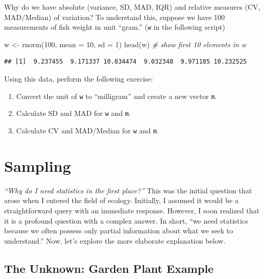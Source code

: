 \documentclass[
]{book}
\newenvironment{Shaded}{\begin{snugshade}}{\end{snugshade}}
\newcommand{\AttributeTok}[1]{\textcolor[rgb]{0.77,0.63,0.00}{#1}}
\newcommand{\CommentTok}[1]{\textcolor[rgb]{0.56,0.35,0.01}{\textit{#1}}}
\newcommand{\DecValTok}[1]{\textcolor[rgb]{0.00,0.00,0.81}{#1}}
\newcommand{\FunctionTok}[1]{\textcolor[rgb]{0.00,0.00,0.00}{#1}}
\newcommand{\NormalTok}[1]{#1}
\newcommand{\OtherTok}[1]{\textcolor[rgb]{0.56,0.35,0.01}{#1}}
\begin{document}
Why do we have absolute (variance, SD, MAD, IQR) and relative measures (CV, MAD/Median) of variation? To understand this, suppose we have 100 measurements of fish weight in unit ``gram.'' (\texttt{w} in the following script)

\begin{Shaded}
\begin{Highlighting}[]
\NormalTok{w }\OtherTok{\textless{}{-}} \FunctionTok{rnorm}\NormalTok{(}\DecValTok{100}\NormalTok{, }\AttributeTok{mean =} \DecValTok{10}\NormalTok{, }\AttributeTok{sd =} \DecValTok{1}\NormalTok{)}
\FunctionTok{head}\NormalTok{(w) }\CommentTok{\# show first 10 elements in w}
\end{Highlighting}
\end{Shaded}

\begin{verbatim}
## [1]  9.237455  9.171337 10.834474  9.032348  9.971185 10.232525
\end{verbatim}

Using this data, perform the following exercise:

\begin{enumerate}
\def\labelenumi{\arabic{enumi}.}
\item
  Convert the unit of \texttt{w} to ``milligram'' and create a new vector \texttt{m}.
\item
  Calculate SD and MAD for \texttt{w} and \texttt{m}.
\item
  Calculate CV and MAD/Median for \texttt{w} and \texttt{m}.
\end{enumerate}

\hypertarget{sampling}{%
\chapter{Sampling}\label{sampling}}

\emph{``Why do I need statistics in the first place?''} This was the initial question that arose when I entered the field of ecology. Initially, I assumed it would be a straightforward query with an immediate response. However, I soon realized that it is a profound question with a complex answer. In short, ``we need statistics because we often possess only partial information about what we seek to understand.'' Now, let's explore the more elaborate explanation below.

\hypertarget{the-unknown-garden-plant-example}{%
\section{The Unknown: Garden Plant Example}\label{the-unknown-garden-plant-example}}
\end{document}
